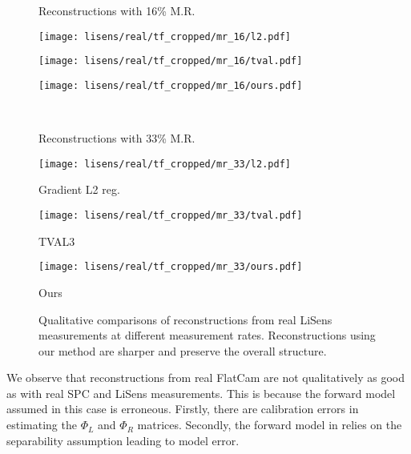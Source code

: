 \documentclass[journal,twoside]{IEEEtran}
\begin{document}
\begin{figure}[!t]
\begin{minipage}{.50\textwidth}
\centering
\centerline{Reconstructions with 16\% M.R.}
\vspace{0.1 cm}
\begin{minipage}{.30\textwidth}
\texttt{[image: lisens/real/tf\_cropped/mr\_16/l2.pdf]}  
\end{minipage}
\begin{minipage}{.30\textwidth}
\texttt{[image: lisens/real/tf\_cropped/mr\_16/tval.pdf]}  
\end{minipage}
\begin{minipage}{.30\textwidth}
\texttt{[image: lisens/real/tf\_cropped/mr\_16/ours.pdf]}  
\end{minipage}\\
\vspace{0.1cm}
\centerline{Reconstructions with 33\% M.R.}
\vspace{0.1cm}
\begin{minipage}{.30\textwidth}
\texttt{[image: lisens/real/tf\_cropped/mr\_33/l2.pdf]}  
\centerline{Gradient L2 reg.}
\end{minipage}
\begin{minipage}{.30\textwidth}
\texttt{[image: lisens/real/tf\_cropped/mr\_33/tval.pdf]}
\centerline{TVAL3}
\end{minipage}
\begin{minipage}{.30\textwidth}
\texttt{[image: lisens/real/tf\_cropped/mr\_33/ours.pdf]} 
\centerline{Ours}
\end{minipage}
\end{minipage}
\caption{Qualitative comparisons of reconstructions from real LiSens measurements at different measurement rates. Reconstructions using our method are sharper and preserve the overall structure. }
\label{fig:lisens_real}
\end{figure}
We observe that reconstructions from real FlatCam are not qualitatively as good as with real SPC and LiSens measurements. This is because the forward model assumed in this case is erroneous. Firstly, there are calibration errors in estimating the $\Phi_L$ and $\Phi_R$ matrices. Secondly, the forward model in \cite{asif2017flatcam} relies on the separability assumption leading to model error. 
\end{document}
